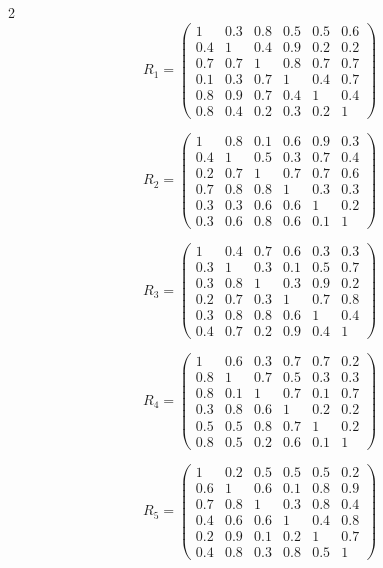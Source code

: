 \begin{multicols}{2}
\[
R_1 = \begin{pmatrix}
1 & 0.3 & 0.8 & 0.5 & 0.5 & 0.6 \\
0.4 & 1 & 0.4 & 0.9 & 0.2 & 0.2 \\
0.7 & 0.7 & 1 & 0.8 & 0.7 & 0.7 \\
0.1 & 0.3 & 0.7 & 1 & 0.4 & 0.7 \\
0.8 & 0.9 & 0.7 & 0.4 & 1 & 0.4 \\
0.8 & 0.4 & 0.2 & 0.3 & 0.2 & 1
\end{pmatrix}
\]

\[
R_2 = \begin{pmatrix}
1 & 0.8 & 0.1 & 0.6 & 0.9 & 0.3 \\
0.4 & 1 & 0.5 & 0.3 & 0.7 & 0.4 \\
0.2 & 0.7 & 1 & 0.7 & 0.7 & 0.6 \\
0.7 & 0.8 & 0.8 & 1 & 0.3 & 0.3 \\
0.3 & 0.3 & 0.6 & 0.6 & 1 & 0.2 \\
0.3 & 0.6 & 0.8 & 0.6 & 0.1 & 1
\end{pmatrix}
\]

\[
R_3 = \begin{pmatrix}
1 & 0.4 & 0.7 & 0.6 & 0.3 & 0.3 \\
0.3 & 1 & 0.3 & 0.1 & 0.5 & 0.7 \\
0.3 & 0.8 & 1 & 0.3 & 0.9 & 0.2 \\
0.2 & 0.7 & 0.3 & 1 & 0.7 & 0.8 \\
0.3 & 0.8 & 0.8 & 0.6 & 1 & 0.4 \\
0.4 & 0.7 & 0.2 & 0.9 & 0.4 & 1
\end{pmatrix}
\]

\[
R_4 = \begin{pmatrix}
1 & 0.6 & 0.3 & 0.7 & 0.7 & 0.2 \\
0.8 & 1 & 0.7 & 0.5 & 0.3 & 0.3 \\
0.8 & 0.1 & 1 & 0.7 & 0.1 & 0.7 \\
0.3 & 0.8 & 0.6 & 1 & 0.2 & 0.2 \\
0.5 & 0.5 & 0.8 & 0.7 & 1 & 0.2 \\
0.8 & 0.5 & 0.2 & 0.6 & 0.1 & 1
\end{pmatrix}
\]

\[
R_5 = \begin{pmatrix}
1 & 0.2 & 0.5 & 0.5 & 0.5 & 0.2 \\
0.6 & 1 & 0.6 & 0.1 & 0.8 & 0.9 \\
0.7 & 0.8 & 1 & 0.3 & 0.8 & 0.4 \\
0.4 & 0.6 & 0.6 & 1 & 0.4 & 0.8 \\
0.2 & 0.9 & 0.1 & 0.2 & 1 & 0.7 \\
0.4 & 0.8 & 0.3 & 0.8 & 0.5 & 1
\end{pmatrix}
\]


\end{multicols}
